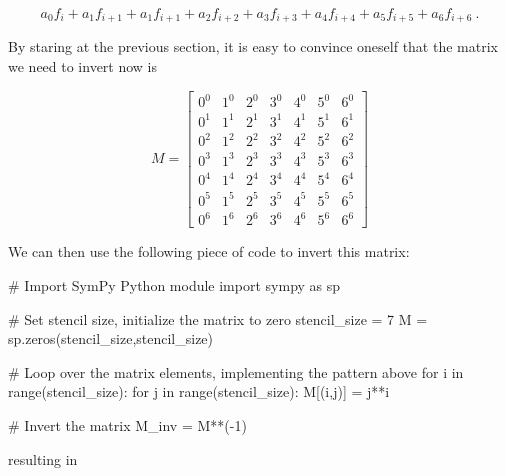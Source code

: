 \documentclass[a4paper,11pt]{article}
\begin{document}
\begin{equation}
a_{0}f_{i} + a_{1}f_{i+1} + a_{1}f_{i+1} + a_{2}f_{i+2} + a_{3}f_{i+3} + a_{4}f_{i+4} + a_{5}f_{i+5} + a_{6}f_{i+6}\ .
\end{equation}

By staring at the previous section, it is easy to convince oneself that the matrix we need to invert now is

\begin{equation}
M =
\begin{bmatrix}
0^{0} & 1^{0} & 2^{0} & 3^{0} & 4^{0} & 5^{0} & 6^{0}\\
0^{1} & 1^{1} & 2^{1} & 3^{1} & 4^{1} & 5^{1} & 6^{1}\\
0^{2} & 1^{2} & 2^{2} & 3^{2} & 4^{2} & 5^{2} & 6^{2}\\
0^{3} & 1^{3} & 2^{3} & 3^{3} & 4^{3} & 5^{3} & 6^{3}\\
0^{4} & 1^{4} & 2^{4} & 3^{4} & 4^{4} & 5^{4} & 6^{4}\\
0^{5} & 1^{5} & 2^{5} & 3^{5} & 4^{5} & 5^{5} & 6^{5}\\
0^{6} & 1^{6} & 2^{6} & 3^{6} & 4^{6} & 5^{6} & 6^{6}
\end{bmatrix}
\end{equation}

We can then use the following piece of code to invert this matrix:

\begin{center}
\begin{minipage}[c]{0.90\textwidth}
\begin{python}
# Import SymPy Python module
import sympy as sp

# Set stencil size, initialize the matrix to zero
stencil_size = 7
M = sp.zeros(stencil_size,stencil_size)

# Loop over the matrix elements, implementing the pattern above
for i in range(stencil_size):
    for j in range(stencil_size):
        M[(i,j)] = j**i

# Invert the matrix
M_inv = M**(-1)
\end{python}
\end{minipage}
\end{center}

resulting in
\end{document}
